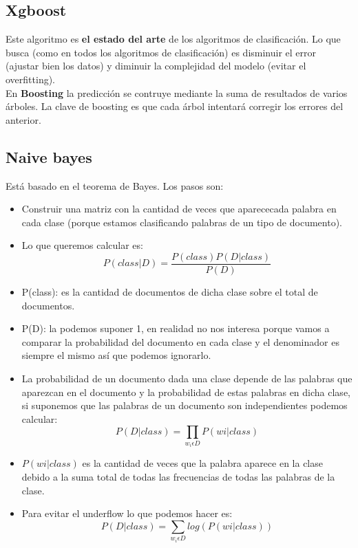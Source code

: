 \documentclass[titlepage,a4paper]{article}
\begin{document}
\subsection*{Xgboost}

Este algoritmo es \textbf{el estado del arte } de los algoritmos de clasificación. Lo que busca (como en todos los algoritmos de clasificación) es disminuir el error (ajustar bien los datos)  y diminuir la complejidad del modelo (evitar el overfitting). \\

En \textbf{Boosting} la predicción se contruye mediante la suma de resultados de varios árboles. La clave de boosting es que cada árbol intentará corregir los errores del anterior. 


\subsection*{Naive bayes}

Está basado en el teorema de Bayes. Los pasos son: 
\begin{itemize}
\item Construir una matriz con la cantidad de veces que aparececada palabra en cada clase (porque estamos clasificando palabras de un tipo de documento).
\item Lo que queremos calcular es: $$P(class | D) = \frac{P(class) P( D | class)}{P(D)}$$
\item P(class): es la cantidad de documentos de dicha clase sobre el total de documentos. 
\item P(D): la podemos suponer 1, en realidad no nos interesa porque vamos a comparar la probabilidad del documento en cada clase y el denominador es siempre el mismo así que podemos ignorarlo.
\item La probabilidad de un documento dada una clase depende de las palabras que aparezcan en el documento y la probabilidad de estas palabras en dicha clase, si suponemos que las palabras de un documento son independientes podemos calcular: $$P(D | class) = \prod_{w_i \epsilon 
D}  P(wi | class) $$
\item $ P(wi | class)$ es la cantidad de veces que la palabra aparece en la clase debido a la suma total de todas las frecuencias de todas las palabras de la clase. 
\item Para evitar el underflow lo que podemos hacer es: $$P(D | class) = \sum_{w_i \epsilon 
D}  log(P(wi | class)) $$
\end{itemize}
\end{document}
